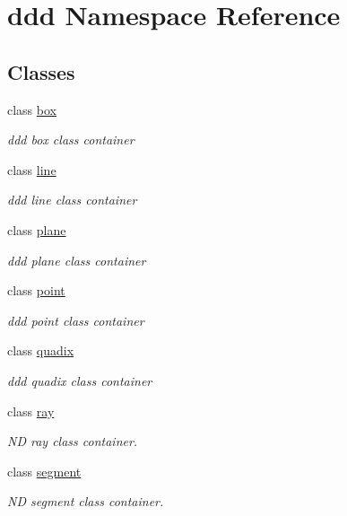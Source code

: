 \hypertarget{namespaceddd}{}\section{ddd Namespace Reference}
\label{namespaceddd}
\subsection*{Classes}
\begin{DoxyCompactItemize}
\item 
class \hyperlink{classddd_1_1box}{box}
\begin{DoxyCompactList}\small\item\em ddd box class container \end{DoxyCompactList}\item 
class \hyperlink{classddd_1_1line}{line}
\begin{DoxyCompactList}\small\item\em ddd line class container \end{DoxyCompactList}\item 
class \hyperlink{classddd_1_1plane}{plane}
\begin{DoxyCompactList}\small\item\em ddd plane class container \end{DoxyCompactList}\item 
class \hyperlink{classddd_1_1point}{point}
\begin{DoxyCompactList}\small\item\em ddd point class container \end{DoxyCompactList}\item 
class \hyperlink{classddd_1_1quadix}{quadix}
\begin{DoxyCompactList}\small\item\em ddd quadix class container \end{DoxyCompactList}\item 
class \hyperlink{classddd_1_1ray}{ray}
\begin{DoxyCompactList}\small\item\em ND ray class container. \end{DoxyCompactList}\item 
class \hyperlink{classddd_1_1segment}{segment}
\begin{DoxyCompactList}\small\item\em ND segment class container. \end{DoxyCompactList}\item 

\end{DoxyCompactItemize}
